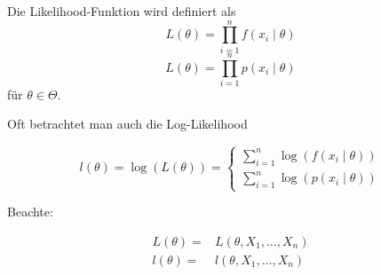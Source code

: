 \documentclass[10pt]{article}
\newcommand{\FZV}{X_1, \ldots, X_n} %
\newcommand{\eqname}[1]{\tag*{#1}}%
\begin{document}
	\begin{Definition} 
		Die Likelihood-Funktion wird definiert als
		\begin{equation*}
			L(\theta) = \prod_{i=1}^{n} f(x_i \mid \theta) \eqname{stetig}
		\end{equation*}
		\begin{equation*}
			L(\theta) = \prod_{i=1}^{n} p(x_i \mid \theta) \eqname{diskret}
		\end{equation*}
		für $\theta \in \Theta$.
	\end{Definition}
	
	Oft betrachtet man auch die Log-Likelihood
	
	\begin{Definition} 
		\begin{equation*}
			l(\theta) = \log ( L(\theta)) = \begin{cases}
				\sum_{i=1}^{n} \log (f(x_i \mid \theta)) \\
				\sum_{i=1}^{n} \log (p(x_i \mid \theta)) 
			\end{cases}
		\end{equation*}
	\end{Definition}
	
	Beachte: 
	
	\begin{equation*}
		\begin{split}
			L(\theta) =& L(\theta, \FZV)\\
			l(\theta) =&l(\theta, \FZV)
		\end{split}
		\eqname{zufällig}
	\end{equation*}
	
\end{document}

